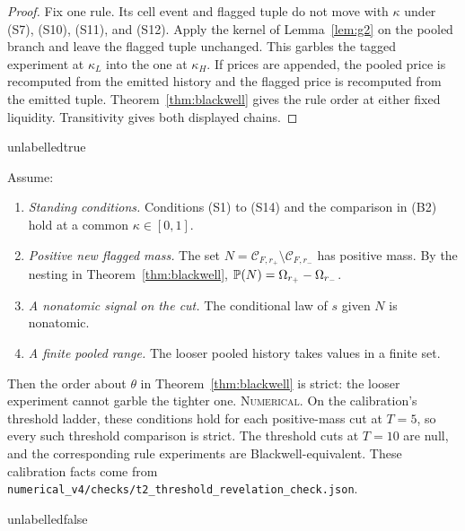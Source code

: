 \begin{proof}
Fix one rule. Its cell event and flagged tuple do not move with $\kappa$ under (S7), (S10),
(S11), and (S12). Apply the kernel of Lemma~\ref{lem:g2} on the pooled branch and leave the flagged
tuple unchanged. This garbles the tagged experiment at $\kappa_L$ into the one at
$\kappa_H$. If prices are appended, the pooled price is recomputed from the emitted history and
the flagged price is recomputed from the emitted tuple. Theorem~\ref{thm:blackwell}
gives the rule order at either fixed liquidity. Transitivity gives both displayed chains.
\end{proof}

\csname unlabelledtrue\endcsname
\begin{corollary}
\label{cor:blackwell-strict}
Assume:
\begin{enumerate}[label=(R\arabic*),leftmargin=3.0em,itemsep=3pt]
\item \emph{Standing conditions.} Conditions (S1) to (S14) and the comparison in (B2) hold at a
  common $\kappa\in[0,1]$.
\item \emph{Positive new flagged mass.} The set
  $N=\mathcal C_{F,r_+}\setminus\mathcal C_{F,r_-}$ has positive mass. By the nesting in
  Theorem~\ref{thm:blackwell}, $\mathbb{P}(N)=\Omega_{r_+}-\Omega_{r_-}$.
\item \emph{A nonatomic signal on the cut.} The conditional law of $s$ given $N$ is nonatomic.
\item \emph{A finite pooled range.} The looser pooled history takes values in a finite set.
\end{enumerate}
Then the order about $\theta$ in Theorem~\ref{thm:blackwell} is strict: the looser experiment cannot
garble the tighter one. \textsc{Numerical.} On the calibration's threshold ladder, these conditions
hold for each positive-mass cut at $T=5$, so every such threshold comparison is strict. The
threshold cuts at $T=10$ are null, and the corresponding rule experiments are
Blackwell-equivalent. These calibration facts come from
\texttt{numerical\_v4/checks/t2\_threshold\_revelation\_check.json}.
\end{corollary}
\csname unlabelledfalse\endcsname

